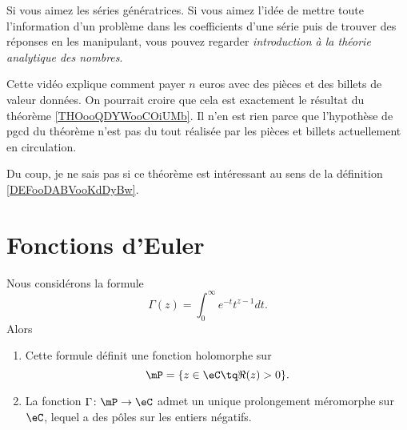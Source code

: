 \begin{normaltext}
	Si vous aimez les séries génératrices. Si vous aimez l'idée de mettre toute l'information d'un problème dans les coefficients d'une série puis de trouver des réponses en les manipulant, vous pouvez regarder \emph{introduction à la théorie analytique des nombres}\cite{BIBooOSKTooBuVtBB}.

	Cette vidéo explique comment payer \( n\) euros avec des pièces et des billets de valeur données. On pourrait croire que cela est exactement le résultat du théorème \ref{THOooQDYWooCOiUMb}. Il n'en est rien parce que l'hypothèse de pgcd du théorème n'est pas du tout réalisée par les pièces et billets actuellement en circulation.

	Du coup, je ne sais pas si ce théorème est intéressant au sens de la définition \ref{DEFooDABVooKdDyBw}.
\end{normaltext}

\section{Fonctions d'Euler}

\begin{theorem}   \label{ThoZJYooWKfbVz}
	Nous considérons la formule
	\begin{equation}
		\Gamma(z)=\int_0^{\infty} e^{-t}t^{z-1}dt.
	\end{equation}
	Alors
	\begin{enumerate}
		\item
		      Cette formule définit une fonction holomorphe sur
		      \begin{equation}
			      \mP=\{ z\in \eC\tq \Re(z)>0 \}.
		      \end{equation}
		\item
		      La fonction \( \Gamma\colon \mP\to \eC\) admet un unique prolongement méromorphe sur \( \eC\), lequel a des pôles sur les entiers négatifs.
	\end{enumerate}
\end{theorem}

